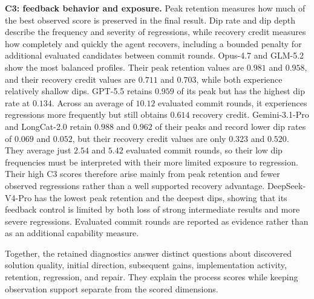 \textbf{C3: feedback behavior and exposure.}  Peak retention measures how much of the best observed score is preserved in the final result. Dip rate and dip depth describe the frequency and severity of regressions, while recovery credit measures how completely and quickly the agent recovers, including a bounded penalty for additional evaluated candidates between commit rounds. Opus-4.7 and GLM-5.2 show the most balanced profiles.  Their peak retention values are $0.981$ and $0.958$, and their recovery credit values are $0.711$ and $0.703$, while both experience relatively shallow dips.  GPT-5.5 retains $0.959$ of its peak but has the highest dip rate at $0.134$.  Across an average of $10.12$ evaluated commit rounds, it experiences regressions more frequently but still obtains $0.614$ recovery credit. Gemini-3.1-Pro and LongCat-2.0 retain $0.988$ and $0.962$ of their peaks and record lower dip rates of $0.069$ and $0.052$, but their recovery credit values are only $0.323$ and $0.520$. They average just $2.54$ and $5.42$ evaluated commit rounds, so their low dip frequencies must be interpreted with their more limited exposure to regression. Their high C3 scores therefore arise mainly from peak retention and fewer observed regressions rather than a well supported recovery advantage. DeepSeek-V4-Pro has the lowest peak retention and the deepest dips, showing that its feedback control is limited by both loss of strong intermediate results and more severe regressions.  Evaluated commit rounds are reported as evidence rather than as an additional capability measure.

Together, the retained diagnostics answer distinct questions about discovered solution quality, initial direction, subsequent gains, implementation activity, retention, regression, and repair. They explain the process scores while keeping observation support separate from the scored dimensions.
